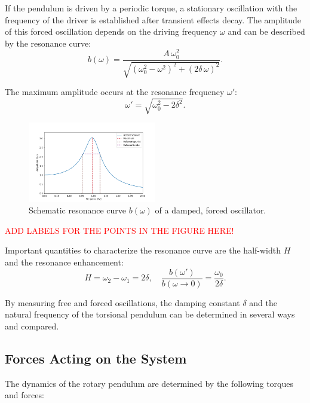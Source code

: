 If the pendulum is driven by a periodic torque, a stationary oscillation with the frequency of the driver is established after transient effects decay. The amplitude of this forced oscillation depends on the driving frequency $\omega$ and can be described by the resonance curve:
\begin{equation}
b(\omega) = \frac{A \, \omega_0^2}{\sqrt{(\omega_0^2 - \omega^2)^2 + (2 \delta \, \omega)^2}}.
\end{equation}

The maximum amplitude occurs at the resonance frequency $\omega'$:
\begin{equation}
\omega' = \sqrt{\omega_0^2 - 2 \delta^2}.
\end{equation}

\begin{figure}[h!]
    \centering
    \includegraphics[width=0.5\textwidth]{img/13/Resonanzkurve_allgemein.png}
    \caption{ Schematic resonance curve $b(\omega)$ of a damped, forced oscillator.}
    \label{fig:resonancecurve}
\end{figure}

\textcolor{red}{ADD LABELS FOR THE POINTS IN THE FIGURE HERE!}

Important quantities to characterize the resonance curve are the half-width $H$ and the resonance enhancement:
\begin{equation}
H = \omega_2 - \omega_1 = 2 \delta, \quad \frac{b(\omega')}{b(\omega \to 0)} = \frac{\omega_0}{2 \delta}.
\end{equation}

By measuring free and forced oscillations, the damping constant $\delta$ and the natural frequency of the torsional pendulum can be determined in several ways and compared.

\subsection*{Forces Acting on the System}
The dynamics of the rotary pendulum are determined by the following torques and forces:

